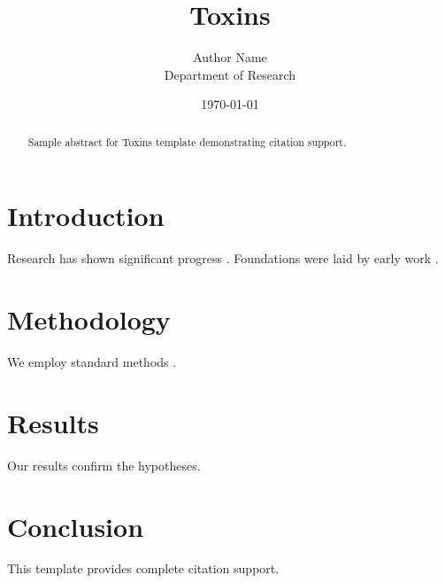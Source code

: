 \documentclass{mdpi}
\title{Toxins}
\author{Author Name \\ \small Department of Research}
\date{\today}
\begin{document}
\maketitle

\begin{abstract}
Sample abstract for Toxins template demonstrating citation support.
\end{abstract}

\section{Introduction}
Research has shown significant progress \citep{einstein1905}. Foundations were laid by early work \citep{turing1950}.

\section{Methodology}
We employ standard methods \citep{knuth1984}.

\section{Results}
Our results confirm the hypotheses.

\section{Conclusion}
This template provides complete citation support.



\end{document}
